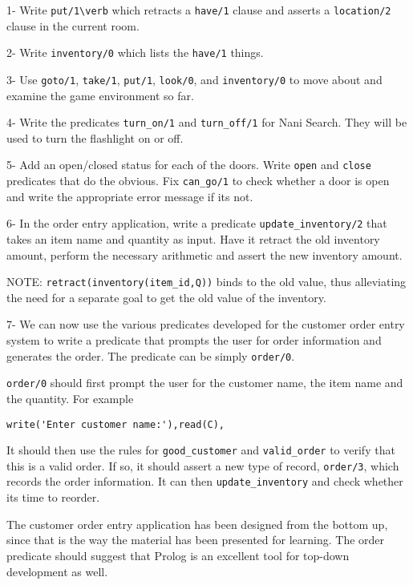 \secdown


1- Write \verb'put/1\verb' which retracts a \verb'have/1' clause and asserts a
\verb'location/2' clause in the current room.

2- Write \verb'inventory/0' which lists the \verb'have/1' things.

3- Use \verb'goto/1', \verb'take/1', \verb'put/1', \verb'look/0', and
\verb'inventory/0' to move about and examine the game environment so far.

4- Write the predicates \verb'turn_on/1' and \verb'turn_off/1' for Nani Search.
They will be used to turn the flashlight on or off.

5- Add an open/closed status for each of the doors. Write \verb'open' and
\verb'close' predicates that do the obvious. Fix \verb'can_go/1' to check
whether a door is open and write the appropriate error message if its not.


6- In the order entry application, write a predicate \verb'update_inventory/2'
that takes an item name and quantity as input. Have it retract the old inventory
amount, perform the necessary arithmetic and assert the new inventory amount.

NOTE: \verb'retract(inventory(item_id,Q))' binds  to the old value, thus
alleviating the need for a separate goal to get the old value of the inventory.

7- We can now use the various predicates developed for the customer order entry
system to write a predicate that prompts the user for order information and
generates the order. The predicate can be simply \verb'order/0'.

\verb'order/0' should first prompt the user for the customer name, the item name
and the quantity. For example

\begin{verbatim}
write('Enter customer name:'),read(C),
\end{verbatim}
It should then use the rules for \verb'good_customer' and \verb'valid_order' to
verify that this is a valid order. If so, it should assert a new type of record,
\verb'order/3', which records the order information. It can then
\verb'update_inventory' and check whether its time to reorder.

The customer order entry application has been designed from the bottom up, since
that is the way the material has been presented for learning. The order
predicate should suggest that Prolog is an excellent tool for top-down
development as well.

